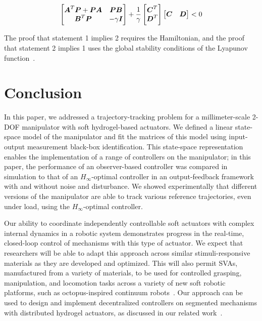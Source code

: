     \begin{equation*}
		\begin{bmatrix}
		\boldsymbol{A}^T\boldsymbol{P}+\boldsymbol{PA} &  \boldsymbol{PB} \\
		\boldsymbol{B}^T\boldsymbol{P}    & -\gamma \boldsymbol{I} \\
		\end{bmatrix}+\dfrac{1}{\gamma}	\begin{bmatrix}
		\boldsymbol{C}^T\\
		\boldsymbol{D}^T\\
		\end{bmatrix}\begin{bmatrix}
		\boldsymbol{C} & \boldsymbol{D}\\
		\end{bmatrix} < 0
		\label{eq-LMI}
		\end{equation*}

The proof that statement 1 implies 2 requires the Hamiltonian, and the proof that statement 2 implies 1 uses the global stability conditions of the Lyapunov function~\cite{Boyd1994}.
\section{Conclusion}

In this paper, we addressed a trajectory-tracking problem for a millimeter-scale 2-DOF manipulator with soft hydrogel-based actuators. We defined a linear state-space model of the manipulator and fit the matrices of this model using input-output measurement black-box identification. This state-space representation enables the implementation of a range of controllers on the manipulator; in this paper, the performance of an observer-based controller was compared in simulation to that of an $H_{\infty}$-optimal controller in an output-feedback framework with and without noise and disturbance. We showed experimentally that different versions of the manipulator are able to track various reference trajectories, even under load, using the $H_{\infty}$-optimal controller.

Our ability to coordinate independently controllable soft actuators with complex internal dynamics in a robotic system demonstrates progress in the real-time, closed-loop control of mechanisms with this type of actuator. We expect that researchers will be able to adapt this approach across similar stimuli-responsive materials as they are developed and optimized. This will also permit SVAs, manufactured from a variety of materials, to be used for controlled grasping, manipulation, and locomotion tasks across a variety of new soft robotic platforms, such as octopus-inspired continuum robots~\cite{Doroudchi2020}. Our approach can be used to design and implement decentralized controllers on segmented mechanisms with distributed hydrogel actuators, as discussed in our related work~\cite{Doroudchi2020,Doroudchi2019}.

